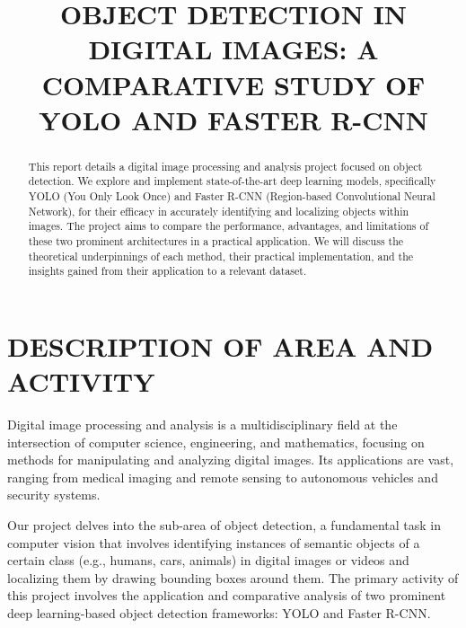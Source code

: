 \documentclass[conference]{IEEEtran}
\begin{document}
\title{\textbf{OBJECT DETECTION IN DIGITAL IMAGES: A COMPARATIVE STUDY OF YOLO AND FASTER R-CNN}}

\author{
}


\maketitle 

\begin{abstract}
This report details a digital image processing and analysis project focused on object detection. We explore and implement state-of-the-art deep learning models, specifically YOLO (You Only Look Once) and Faster R-CNN (Region-based Convolutional Neural Network), for their efficacy in accurately identifying and localizing objects within images. The project aims to compare the performance, advantages, and limitations of these two prominent architectures in a practical application. We will discuss the theoretical underpinnings of each method, their practical implementation, and the insights gained from their application to a relevant dataset.
\end{abstract}

 
\section{\uppercase{Description of Area and Activity}} 
\label{sec:intro}

Digital image processing and analysis is a multidisciplinary field at the intersection of computer science, engineering, and mathematics, focusing on methods for manipulating and analyzing digital images. Its applications are vast, ranging from medical imaging and remote sensing to autonomous vehicles and security systems.

Our project delves into the sub-area of object detection, a fundamental task in computer vision that involves identifying instances of semantic objects of a certain class (e.g., humans, cars, animals) in digital images or videos and localizing them by drawing bounding boxes around them. The primary activity of this project involves the application and comparative analysis of two prominent deep learning-based object detection frameworks: YOLO and Faster R-CNN.
\end{document}
